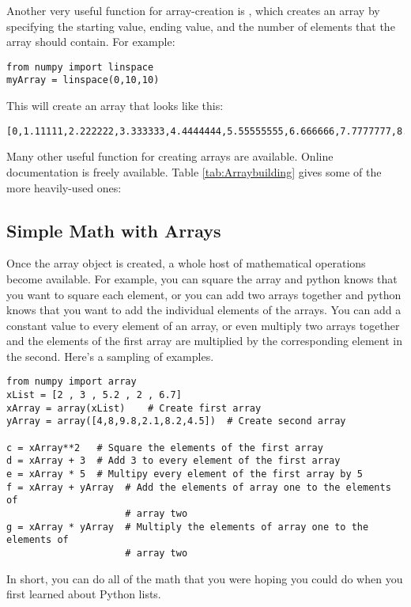  Another very useful function for array-creation is ,
which creates an array by specifying the starting value, ending value,
and the number of elements that the array should contain.  For example:
\begin{Verbatim}
from numpy import linspace
myArray = linspace(0,10,10)
\end{Verbatim}
This will create an array that looks like this:
\begin{Verbatim}
[0,1.11111,2.222222,3.333333,4.4444444,5.55555555,6.666666,7.7777777,8.8888888,10]
\end{Verbatim}
Many other useful function for creating arrays are available.  Online
documentation is freely available.  Table \ref{tab:Arraybuilding} gives some of the more
heavily-used ones:

\subsection*{Simple Math with Arrays}
Once the array object is created, a whole host of mathematical
operations become available.  For example, you can square the array
and python knows that you want to square each element, or you can add
two arrays together and python knows that you want to add the
individual elements of the arrays.  You can add a constant value to
every element of an array, or even multiply two arrays together and
the elements of the first array are multiplied by the corresponding
element in the second.  Here's a sampling of examples.
\begin{Verbatim}
from numpy import array
xList = [2 , 3 , 5.2 , 2 , 6.7]
xArray = array(xList)    # Create first array
yArray = array([4,8,9.8,2.1,8.2,4.5])  # Create second array

c = xArray**2   # Square the elements of the first array
d = xArray + 3  # Add 3 to every element of the first array
e = xArray * 5  # Multipy every element of the first array by 5
f = xArray + yArray  # Add the elements of array one to the elements of
                     # array two
g = xArray * yArray  # Multiply the elements of array one to the elements of
                     # array two
\end{Verbatim}
In short, you can do all of the math that you were hoping you could do
when you first learned about Python lists.
